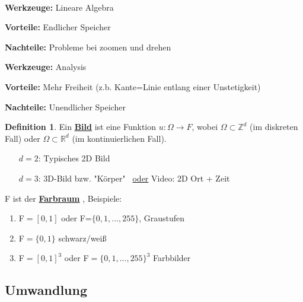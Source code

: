 \documentclass{article}
\theoremstyle{plain}
\theoremstyle{definition}
\newtheorem*{definition*}{Definition}
\numberwithin{equation}{section}
\newcommand{\mim}[1] {
\underline{\textbf{#1\index{#1}}}
}
\newcommand{\pa}[1] {
    \par{\textbf{#1}}
}
\begin{document}
        \ \\

        \begin{minipage}[t]{0.47\linewidth}
            \pa{Werkzeuge:} Lineare Algebra
            \pa{Vorteile:} Endlicher Speicher
            \pa{Nachteile:} Probleme bei zoomen und drehen
        \end{minipage}
        \hfill\vrule\hfill
        \begin{minipage}[t]{0.47\linewidth}
            \pa{Werkzeuge:} Analysis
            \pa{Vorteile:} Mehr Freiheit (z.b. Kante=Linie entlang einer Unstetigkeit)
            \pa{Nachteile:} Unendlicher Speicher
        \end{minipage}

        \begin{definition*}
            Ein \mim{Bild} ist eine Funktion $u: \Omega \to F$, wobei $\Omega \subset \mathbb Z^d$ (im diskreten Fall) oder $\Omega \subset \mathbb R^d$ (im kontinuierlichen Fall).
            \begin{enumerate}
                \item[$d=2$:] Typisches 2D Bild
                \item[$d=3$:] 3D-Bild bzw. "Körper" \ \underline{oder} Video: 2D Ort + Zeit
            \end{enumerate}
            F ist der \mim{Farbraum}, Beispiele:
            \begin{enumerate}[label=\textbullet]
                \item F$=[0,1]$ oder F=$\{0,1,..., 255\}$, Graustufen
                \item F$=\{0,1\}$ schwarz/weiß
                \item F$=[0,1]^3$ oder F$=\{0,1,...,255\}^3$ Farbbilder
            \end{enumerate}
        \end{definition*}
    \subsection{Umwandlung}
\end{document}
